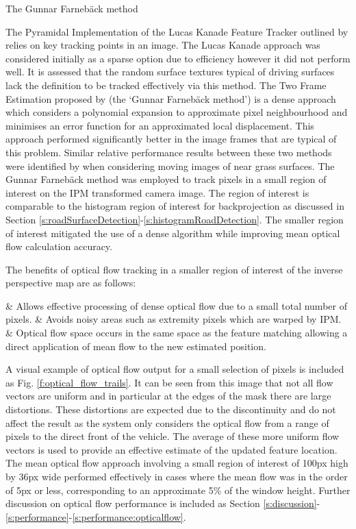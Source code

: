 \documentclass[]{aiaa-tc}%
\begin{document}
The Gunnar Farneb{\"a}ck method \citep{opticalFlowSolution} 

The Pyramidal Implementation of the Lucas Kanade Feature Tracker outlined by \citet{opticalFlowLKPyramidal} relies on key tracking points in an image. The Lucas Kanade approach was considered initially as a sparse option due to efficiency however it did not perform well. It is assessed that the random surface textures typical of driving surfaces lack the definition to be tracked effectively via this method. The Two Frame Estimation proposed by \citet{opticalFlowSolution} (the `Gunnar Farneb{\"a}ck method') is a dense approach which considers a polynomial expansion to approximate pixel neighbourhood and minimises an error function for an approximated local displacement. This approach performed significantly better in the image frames that are typical of this problem. Similar relative performance results between these two methods were identified by \citet{opticalFlowLKvsDenseUAV} when considering moving images of near grass surfaces. The Gunnar Farneb{\"a}ck method was employed to track pixels in a small region of interest on the IPM transformed camera image. The region of interest is comparable to the histogram region of interest for backprojection as discussed in Section \ref{s:roadSurfaceDetection}-\ref{s:histogramRoadDetection}. The smaller region of interest mitigated the use of a dense algorithm while improving mean optical flow calculation accuracy.


The benefits of optical flow tracking in a smaller region of interest of the inverse perspective map are as follows:
\begin{easylist}
	& Allows effective processing of dense optical flow due to a small total number of pixels.
	& Avoids noisy areas such as extremity pixels which are warped by IPM.
	& Optical flow space occurs in the same space as the feature matching allowing a direct application of mean flow to the new estimated position.
\end{easylist}

A visual example of optical flow output for a small selection of pixels is included as Fig. \ref{f:optical_flow_trails}. It can be seen from this image that not all flow vectors are uniform and in particular at the edges of the mask there are large distortions. These distortions are expected due to the discontinuity and do not affect the result as the system only considers the optical flow from a range of pixels to the direct front of the vehicle. The average of these more uniform flow vectors is used to provide an effective estimate of the updated feature location. The mean optical flow approach involving a small region of interest of 100px high by 36px wide performed effectively in cases where the mean flow was in the order of 5px or less, corresponding to an approximate 5\% of the window height. Further discussion on optical flow performance is included as Section \ref{s:discussion}-\ref{s:performance}-\ref{s:performance:opticalflow}. 
\end{document}

